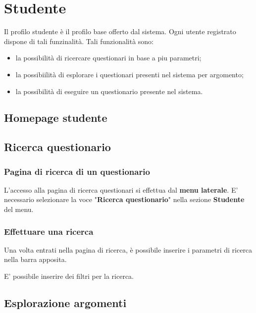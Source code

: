 \documentclass[12pt,a4paper]{article}
\begin{document}
	\newpage

	\section{Studente}\label{studente}
	Il profilo studente è il profilo  base offerto dal sistema. Ogni utente registrato dispone di tali funzinalità. Tali funzionalità sono:
	\begin{itemize}
		\item la possibilità di ricercare questionari in base a piu parametri;
		\item la possibiilità di esplorare i questionari presenti nel sistema per argomento;
		\item la possibilità di eseguire un questionario presente nel sistema.
	\end{itemize}
	
	\subsection{Homepage studente}
	\subsection{Ricerca questionario}\label{ricerca_questionario}
	\subsubsection{Pagina di ricerca  di un questionario}
	L'accesso alla pagina di ricerca questionari si effettua dal \textbf{menu laterale}. 
	E' necessario selezionare la voce "\textbf{Ricerca questionario}" nella sezione \textbf{Studente} del menu.
	\subsubsection{Effettuare una ricerca}
	Una volta entrati nella pagina di ricerca, è possibile inserire i parametri di ricerca nella barra apposita.

	
	E' possibile inserire dei filtri per la ricerca. 

	\subsection{Esplorazione argomenti}
	
\end{document}
